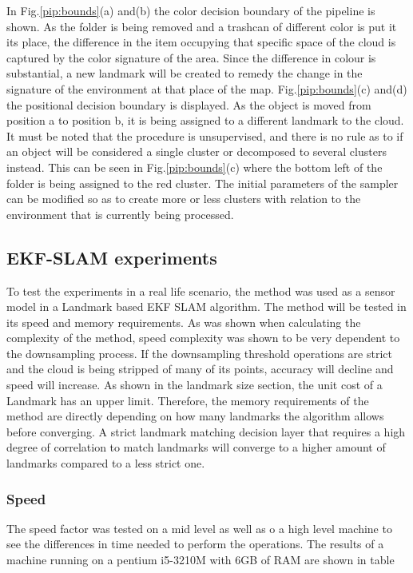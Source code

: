 \documentclass[twoside,hidelinks]{article}
\begin{document}
In Fig.\ref{pip:bounds}(a) and(b) the color decision boundary of the pipeline is shown. As the folder is being removed and a trashcan of different color is put it its place, the difference in the item occupying that specific space of the cloud is captured by the color signature of the area. Since the difference in colour is substantial, a new landmark will be created to remedy the change in the signature of the environment at that place of the map. Fig.\ref{pip:bounds}(c) and(d) the positional decision boundary is displayed. As the object is moved from position a to position b, it is being assigned to a different landmark to the cloud. It must be noted that the procedure is unsupervised, and there is no rule as to if an object will be considered a single cluster or decomposed to several clusters instead. This can be seen in Fig.\ref{pip:bounds}(c) where the bottom left of the folder is being assigned to the red cluster. The initial parameters of the sampler can be modified so as to create more or less clusters with relation to the environment that is currently being processed. 


\subsection{EKF-SLAM experiments}

To test the experiments in a real life scenario, the method was used as a sensor model in a Landmark based EKF SLAM algorithm. The method will be tested in its speed and memory requirements. As was shown when calculating the complexity of the method, speed complexity was shown to be very dependent to the downsampling process. If the downsampling threshold operations are strict and the cloud is being stripped of many of its points, accuracy will decline and speed will increase. As shown in the landmark size section, the unit cost of a Landmark has an upper limit. Therefore, the memory requirements of the method are directly depending on how many landmarks the algorithm allows before converging. A strict landmark matching decision layer that requires a high degree of correlation to match landmarks will converge to a higher amount of landmarks compared to a less strict one.

\subsubsection{Speed}

The speed factor was tested on a mid level as well as o a high level machine to see the differences in time needed to perform the operations. The results of a machine running on a pentium i5-3210M with 6GB of RAM are shown in table
\end{document}
